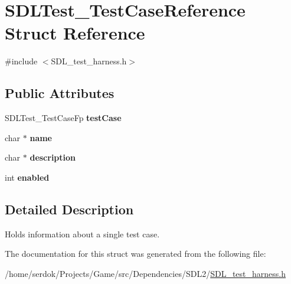 \hypertarget{structSDLTest__TestCaseReference}{}\section{S\+D\+L\+Test\+\_\+\+Test\+Case\+Reference Struct Reference}
\label{structSDLTest__TestCaseReference}


{\ttfamily \#include $<$S\+D\+L\+\_\+test\+\_\+harness.\+h$>$}

\subsection*{Public Attributes}
\begin{DoxyCompactItemize}
\item 
\mbox{\label{structSDLTest__TestCaseReference_af9472f0c421a2845b540fc28fb30a3ef}} 
S\+D\+L\+Test\+\_\+\+Test\+Case\+Fp {\bfseries test\+Case}
\item 
\mbox{\label{structSDLTest__TestCaseReference_aabd588c915c52fb13bcd0c71e071a604}} 
char $\ast$ {\bfseries name}
\item 
\mbox{\label{structSDLTest__TestCaseReference_a1ee6c8a2529fdfcd62bb1483c26be67d}} 
char $\ast$ {\bfseries description}
\item 
\mbox{\label{structSDLTest__TestCaseReference_a15168c85e38cae7557b4beb477ef6f9a}} 
int {\bfseries enabled}
\end{DoxyCompactItemize}


\subsection{Detailed Description}
Holds information about a single test case. 

The documentation for this struct was generated from the following file\+:\begin{DoxyCompactItemize}
\item 
/home/serdok/\+Projects/\+Game/src/\+Dependencies/\+S\+D\+L2/\hyperlink{SDL__test__harness_8h}{S\+D\+L\+\_\+test\+\_\+harness.\+h}\end{DoxyCompactItemize}
